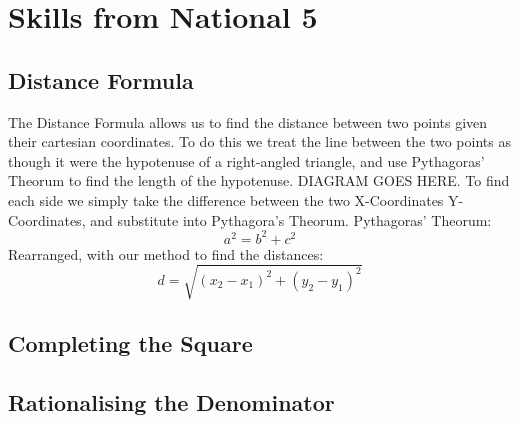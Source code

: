 \chapter{Skills from National 5}

\section{Distance Formula}
The Distance Formula allows us to find the distance between two points given their cartesian coordinates. To do this we treat the line between the two points as though it were the hypotenuse of a right-angled triangle, and use Pythagoras' Theorum to find the length of the hypotenuse.
DIAGRAM GOES HERE.
To find each side we simply take the difference between the two X-Coordinates Y-Coordinates, and substitute into Pythagora's Theorum.
Pythagoras' Theorum:
\begin{equation*}
	a^2 = b^2+c^2
\end{equation*}
Rearranged, with our method to find the distances:
\begin{equation*}
	d = \sqrt{(x_2-x_1)^2+(y_2-y_1)^2}
\end{equation*}

\section{Completing the Square}

\section{Rationalising the Denominator}
